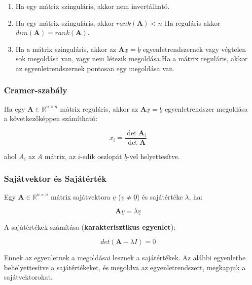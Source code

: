 \documentclass{article}
\begin{document}
\begin{enumerate}
    \item Ha egy mátrix szinguláris, akkor nem invertálható.
    \item Ha egy mátrix szinguláris, akkor $rank(\mathbf{A}) < n $ \newline Ha reguláris akkor $dim(\mathbf{A}) = rank(\mathbf{A})$.
    \item Ha a mátrix szinguláris, akkor az $\mathbf{A}\underline{x} = \underline{b}$ egyenletrendszernek vagy vég\-te\-len sok meg\-ol\-dá\-sa van, vagy nem létezik megoldása.\newline Ha a mátrix reguláris, akkor az egyenletrendszernek pontosan egy meg\-ol\-dá\-sa van.
\end{enumerate}

\subsubsection{Cramer-szabály}

Ha egy $\mathbf{A} \in \mathbb{R}^{n \times n}$ mátrix reguláris, akkor az $\mathbf{A}\underline{x} = \underline{b}$ egyenletrendszer megoldása a következőképpen számítható:

\begin{equation*}
    x_i = \frac{\det \mathbf{A}_i}{\det \mathbf{A}}
\end{equation*}

ahol $A_i$ az $A$ mátrix, az $i$-edik oszlopát $\underline{b}$-vel helyettesítve. 

\subsubsection{Sajátvektor és Sajátérték}

Egy $\mathbf{A} \in \mathbb{R}^{n \times n}$ mátrix sajátvektora $\underline{v}$ ($\underline{v} \neq \underline{0}$) és sajátértéke $\lambda$, ha:

\begin{equation*}
    \mathbf{A}\underline{v} = \lambda\underline{v}
\end{equation*}

A sajátértékek számítása (\textbf{karakterisztikus egyenlet}):

\begin{equation*}
    det(\mathbf{A} - \lambda I) = 0
\end{equation*}

Ennek az egyenletnek a megoldásai lesznek a sajátértékek. Az alábbi e\-gyen\-let\-be behelyettesítve a sajátértékeket, és megoldva az egyenletrendszert, megkapjuk a sajátvektorokat.
\end{document}
